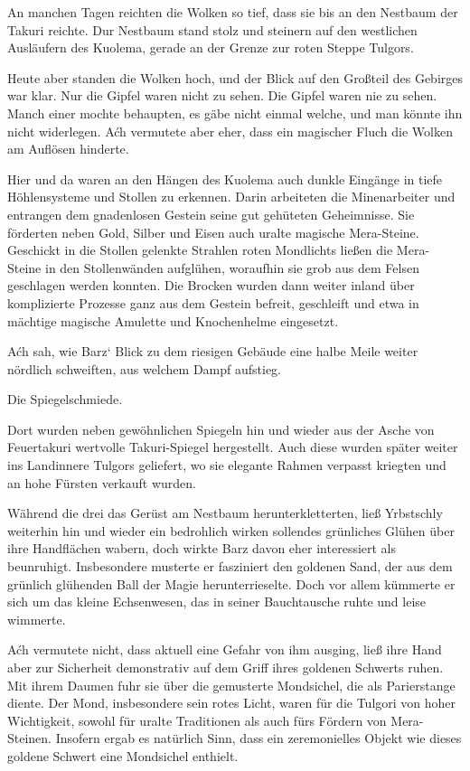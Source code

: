 An manchen Tagen reichten die Wolken so tief, dass sie bis an den Nestbaum der Takuri reichte. Dur Nestbaum stand stolz und steinern auf den westlichen Ausläufern des Kuolema, gerade an der Grenze zur roten Steppe Tulgors.

Heute aber standen die Wolken hoch, und der Blick auf den Großteil des Gebirges war klar. Nur die Gipfel waren nicht zu sehen. Die Gipfel waren nie zu sehen. Manch einer mochte behaupten, es gäbe nicht einmal welche, und man könnte ihn nicht widerlegen. Aćh vermutete aber eher, dass ein magischer Fluch die Wolken am Auflösen hinderte.

Hier und da waren an den Hängen des Kuolema auch dunkle Eingänge in tiefe Höhlensysteme und Stollen zu erkennen. Darin arbeiteten die Minenarbeiter und entrangen dem gnadenlosen Gestein seine gut gehüteten Geheimnisse. Sie förderten neben Gold, Silber und Eisen auch uralte magische Mera-Steine. Geschickt in die Stollen gelenkte Strahlen roten Mondlichts ließen die Mera-Steine in den Stollenwänden aufglühen, woraufhin sie grob aus dem Felsen geschlagen werden konnten. Die Brocken wurden dann weiter inland über komplizierte Prozesse ganz aus dem Gestein befreit, geschleift und etwa in mächtige magische Amulette und Knochenhelme eingesetzt.

Aćh sah, wie Barz‘ Blick zu dem riesigen Gebäude eine halbe Meile weiter nördlich schweiften, aus welchem Dampf aufstieg.

Die Spiegelschmiede.

Dort wurden neben gewöhnlichen Spiegeln hin und wieder aus der Asche von Feuertakuri wertvolle Takuri-Spiegel hergestellt. Auch diese wurden später weiter ins Landinnere Tulgors geliefert, wo sie elegante Rahmen verpasst kriegten und an hohe Fürsten verkauft wurden.

Während die drei das Gerüst am Nestbaum herunterkletterten, ließ Yrbstschly weiterhin hin und wieder ein bedrohlich wirken sollendes grünliches Glühen über ihre Handflächen wabern, doch wirkte Barz davon eher interessiert als beunruhigt. Insbesondere musterte er fasziniert den goldenen Sand, der aus dem grünlich glühenden Ball der Magie herunterrieselte. Doch vor allem kümmerte er sich um das kleine Echsenwesen, das in seiner Bauchtausche ruhte und leise wimmerte.

Aćh vermutete nicht, dass aktuell eine Gefahr von ihm ausging, ließ ihre Hand aber zur Sicherheit demonstrativ auf dem Griff ihres goldenen Schwerts ruhen. Mit ihrem Daumen fuhr sie über die gemusterte Mondsichel, die als Parierstange diente. Der Mond, insbesondere sein rotes Licht, waren für die Tulgori von hoher Wichtigkeit, sowohl für uralte Traditionen als auch fürs Fördern von Mera-Steinen. Insofern ergab es natürlich Sinn, dass ein zeremonielles Objekt wie dieses goldene Schwert eine Mondsichel enthielt.

